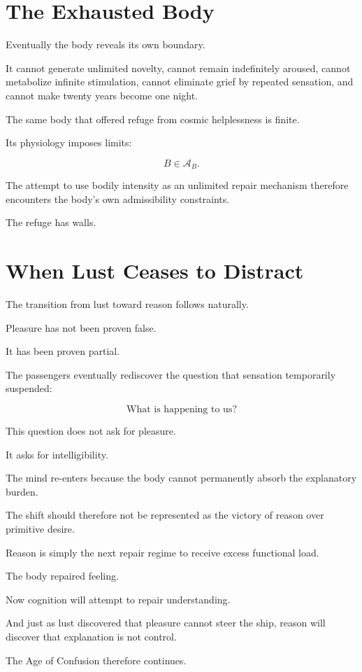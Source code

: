 \documentclass[11pt,oneside]{book}
\theoremstyle{definition}
\theoremstyle{remark}
\newcommand{\A}{\mathcal{A}}
\begin{document}
\section{The Exhausted Body}

Eventually the body reveals its own boundary.

It cannot generate unlimited novelty, cannot remain indefinitely aroused, cannot metabolize infinite stimulation, cannot eliminate grief by repeated sensation, and cannot make twenty years become one night.

The same body that offered refuge from cosmic helplessness is finite.

Its physiology imposes limits:

\[
B\in\A_B.
\]

The attempt to use bodily intensity as an unlimited repair mechanism therefore encounters the body's own admissibility constraints.

The refuge has walls.

\section{When Lust Ceases to Distract}

The transition from lust toward reason follows naturally.

Pleasure has not been proven false.

It has been proven partial.

The passengers eventually rediscover the question that sensation temporarily suspended:

\[
\text{What is happening to us?}
\]

This question does not ask for pleasure.

It asks for intelligibility.

The mind re-enters because the body cannot permanently absorb the explanatory burden.

The shift should therefore not be represented as the victory of reason over primitive desire.

Reason is simply the next repair regime to receive excess functional load.

The body repaired feeling.

Now cognition will attempt to repair understanding.

And just as lust discovered that pleasure cannot steer the ship, reason will discover that explanation is not control.

The Age of Confusion therefore continues.
\end{document}
